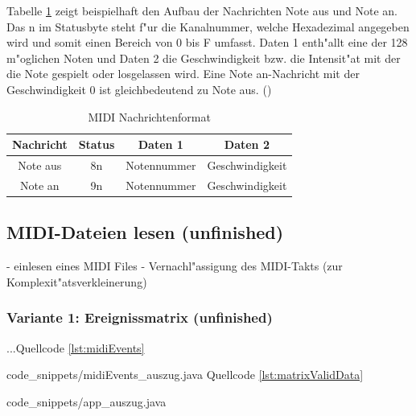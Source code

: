 {Tabelle \ref{tbl:midiMess} zeigt beispielhaft den Aufbau der Nachrichten {\glqq}Note aus{\grqq} und {\glqq}Note an{\grqq}. Das n im Statusbyte steht f"ur die Kanalnummer, welche Hexadezimal angegeben wird und somit einen Bereich von 0 bis F umfasst. Daten 1 enth"allt eine der 128 m"oglichen Noten und Daten 2 die Geschwindigkeit bzw. die Intensit"at mit der die Note gespielt oder losgelassen wird. Eine {\glqq}Note an{\grqq}-Nachricht mit der Geschwindigkeit 0 ist gleichbedeutend zu {\glqq}Note aus{\grqq}.
(\cite{MIDI})

\begin{table} [h]
\centering
\begin{tabular}{|c|c|c|c|}\hline
   \textbf{Nachricht} & \textbf{Status} & \textbf{Daten 1} & \textbf{Daten 2}\\ \hline
   Note aus & 8n & Notennummer & Geschwindigkeit \\ \hline
   Note an & 9n & Notennummer & Geschwindigkeit \\ \hline
 \end{tabular}
\caption{MIDI Nachrichtenformat}
\label{tbl:midiMess} %
\end{table}


\subsection{MIDI-Dateien lesen (unfinished)}
- einlesen eines MIDI Files
- Vernachl"assigung des MIDI-Takts (zur Komplexit"atsverkleinerung)

\subsubsection{Variante 1: Ereignissmatrix (unfinished) }
...Quellcode \ref{lst:midiEvents}

{code_snippets/midiEvents_auszug.java}
Quellcode \ref{lst:matrixValidData}

{code_snippets/app_auszug.java}

}

